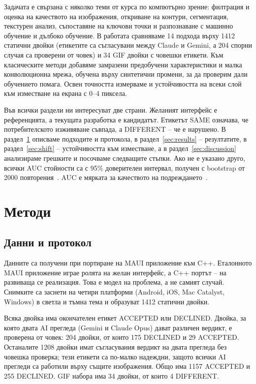 \documentclass[a4paper,12pt]{article}
\begin{document}
Задачата е свързана с няколко теми от курса по компютърно зрение: филтрация и оценка на качеството на изображения, откриване на контури, сегментация, текстурен анализ, съпоставяне на ключови точки и разпознаване с машинно обучение и дълбоко обучение. В работата сравняваме 14 подхода върху 1412 статични двойки (етикетите са съгласувани между Claude и Gemini, а 204 спорни случая са проверени от човек) и 34 GIF двойки с човешки етикети. Към класическите методи добавяме замразени предобучени характеристики и малка конволюционна мрежа, обучена върху синтетични промени, за да проверим дали обучението помага. Освен точността измерваме и устойчивостта на всеки слой към изместване на екрана с 0–4 пиксела.

Във всички раздели ни интересуват две страни. Желаният интерфейс е референцията, а текущата разработка е кандидатът. Етикетът SAME означава, че потребителското изживяване съвпада, а DIFFERENT – че е нарушено. В раздел~\ref{sec:methods} описваме подходите и протокола, в раздел~\ref{sec:results} – резултатите, в раздел~\ref{sec:shift} – устойчивостта към изместване, а в раздел~\ref{sec:discussion} анализираме грешките и посочваме следващите стъпки. Ако не е указано друго, всички AUC стойности са с 95\% доверителен интервал, получен с bootstrap от 2000 повторения~\cite{efron1993}. AUC е мярката за качеството на подреждането~\cite{hanley1982}.

\section{Методи}\label{sec:methods}

\subsection{Данни и протокол}
Данните са получени при портиране на MAUI приложение към C++. Еталонното MAUI приложение играе ролята на желан интерфейс, а C++ портът – на развиваща се реализация. Това е модел на проблема, а не самият случай. Снимките са заснети на четири платформи (Android, iOS, Mac Catalyst, Windows) в светла и тъмна тема и образуват 1412 статични двойки.

Всяка двойка има окончателен етикет ACCEPTED или DECLINED. Двойка, за която двата AI прегледа (Gemini и Claude Opus) дават различен вердикт, е проверена от човек: 204 двойки, от които 175 DECLINED и 29 ACCEPTED. Останалите 1208 двойки имат съгласувания вердикт на двата прегледа без човешка проверка; тези етикети са по-малко надеждни, защото всички AI прегледи са работили върху същите изображения. Общо има 1157 ACCEPTED и 255 DECLINED. GIF набора има 34 двойки, от които 4 DIFFERENT.
\end{document}
